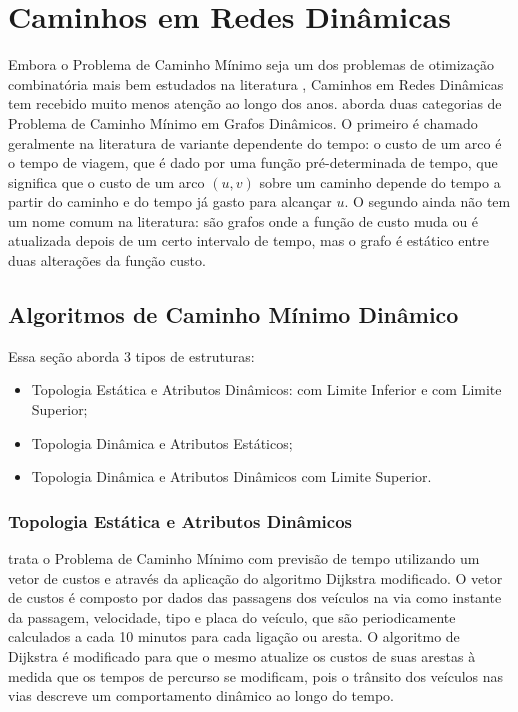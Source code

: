 \section{Caminhos em Redes Dinâmicas}
\label{sec:pathdyn}
Embora o Problema de Caminho Mínimo seja um dos problemas de otimização combinatória mais bem estudados
na literatura \cite{bookahuja}, Caminhos em Redes Dinâmicas tem recebido muito menos atenção ao longo dos anos.
\cite{giacomo} aborda duas categorias de Problema de Caminho Mínimo em Grafos Dinâmicos. O primeiro é chamado
geralmente na literatura de variante dependente do tempo: o custo de um arco é o tempo de viagem, que é dado
por uma função pré-determinada de tempo, que significa que o custo de um arco $(u, v)$ sobre um caminho
depende do tempo a partir do caminho e do tempo já gasto para alcançar $u$.
O segundo ainda não tem um nome comum na literatura: são grafos onde a função de custo muda ou é atualizada
depois de um certo intervalo de tempo, mas o grafo é estático entre duas alterações da função custo.

\subsection{Algoritmos de Caminho Mínimo Dinâmico}
Essa seção aborda 3 tipos de estruturas:
\begin{itemize}
\item Topologia Estática e Atributos Dinâmicos: com Limite Inferior \cite{leonard} e com Limite Superior;
\item Topologia Dinâmica e Atributos Estáticos;
\item Topologia Dinâmica e Atributos Dinâmicos com Limite Superior.
\end{itemize}

\subsubsection{Topologia Estática e Atributos Dinâmicos}
\label{subsec:limitesuperior}
\cite{leonard} trata o Problema de Caminho Mínimo com previsão de tempo utilizando um vetor de custos e
através da aplicação do algoritmo Dijkstra modificado. O vetor de custos é composto por dados das passagens 
dos veículos na via como instante da passagem, velocidade, tipo e placa do veículo, que são periodicamente calculados
a cada 10 minutos para cada ligação ou aresta. O algoritmo de Dijkstra é modificado para que o mesmo atualize os custos
de suas arestas à medida que os tempos de percurso se modificam, pois o trânsito dos veículos nas vias descreve um
comportamento dinâmico ao longo do tempo.

